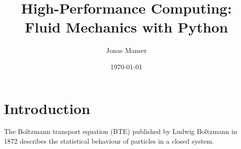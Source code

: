 \documentclass[a4paper]{scrartcl}
\title{High-Performance Computing: Fluid Mechanics with Python}
\author{Jonas Manser}
\date{\today}
\begin{document}
\maketitle

\section{Introduction}
The Boltzmann transport equation (BTE) published by Ludwig Boltzmann in 1872 describes the statistical behaviour of particles in a closed system.
\end{document}
